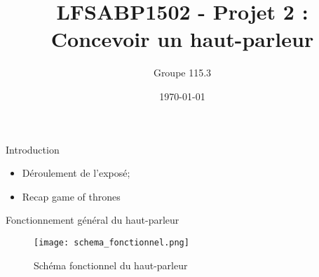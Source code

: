 \documentclass[pdf]{beamer}
\title{LFSABP1502 - Projet 2 : Concevoir un haut-parleur}
\author{Groupe 115.3}
\date{\today}
\begin{document}
\begin{frame}
\titlepage
\end{frame}

\begin{frame}{Introduction}
 \begin{itemize}
		\item Déroulement de l'exposé;
		\item Recap game of thrones
 \end{itemize}
\end{frame}

\begin{frame}{Fonctionnement général du haut-parleur}
\begin{figure}[ht!]
    \centering
    \texttt{[image: schema\_fonctionnel.png]}
    \caption{Schéma fonctionnel du haut-parleur}
    \label{schema_fonctionnel}
\end{figure}
\end{frame}
\end{document}
